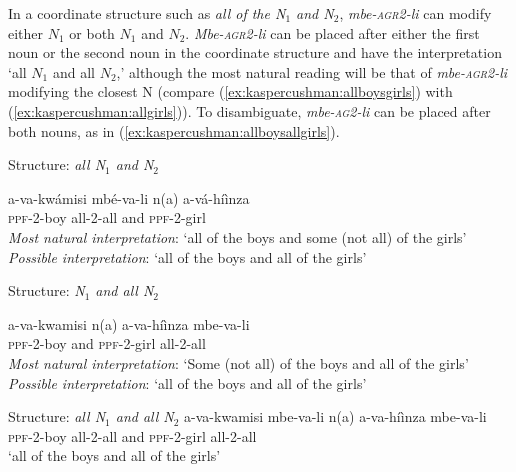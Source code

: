 \documentclass[letterpaper, 12pt]{article}
\begin{document}
In a coordinate structure such as \textit{all of the N$_{1}$ and N$_{2}$}, \emph{mbe-\textsc{agr2}-li}  can modify either $N_{1}$ or both $N_{1}$ and $N_{2}$.  \emph{Mbe-\textsc{agr2}-li} can be placed after either the first noun or the second noun in the coordinate structure and have the interpretation `all $N_{1}$ and all $N_{2}$,' although the most natural reading will be that of \emph{mbe-\textsc{agr2}-li} modifying the closest N (compare (\ref{ex:kaspercushman:allboysgirls}) with (\ref{ex:kaspercushman:allgirls})). To disambiguate, \emph{mbe-\textsc{ag2}-li} can be placed after both nouns, as in (\ref{ex:kaspercushman:allboysallgirls}).

\begin{exe} 
\singlespacing
\ex \begin{xlist} \label{ex:kaspercushman:coordination}

\ex Structure: \emph{all N$_{1}$ and N$_{2}$} 

\gll a-va-kw\'amisi mb\'e-va-li n(a)	a-v\'a-h\'i\`inza \label{ex:kaspercushman:allboysgirls}\\  
\textsc{ppf}-2-boy all-2-all and \textsc{ppf}-2-girl \\
\vspace{-1.25mm}
\textit{Most natural interpretation}: `all of the boys and some (not all) of the girls' \\
\textit{Possible interpretation}: `all of the boys and all of the girls' \\


\vspace{5mm}

\ex  Structure: \emph{N$_{1}$ and all N$_{2}$} 

\gll a-va-kwamisi n(a) a-va-h\'i\`inza mbe-va-li \label{ex:kaspercushman:allgirls}  \\  
\textsc{ppf}-2-boy and \textsc{ppf}-2-girl all-2-all\\

\textit{Most natural interpretation}: `Some (not all) of the boys and all of the girls' \\
\textit{Possible interpretation}: `all of the boys and all of the girls' \\


\vspace{5mm}

\ex  Structure: \emph{all N$_{1}$ and all N$_{2}$} 
\gll a-va-kwamisi mbe-va-li n(a) a-va-h\'i\`inza mbe-va-li  \label{ex:kaspercushman:allboysallgirls} \\  
\textsc{ppf}-2-boy all-2-all  and \textsc{ppf}-2-girl all-2-all\\
`all of the boys and all of the girls' \\

\end{xlist}
\end{exe} 
\end{document}
